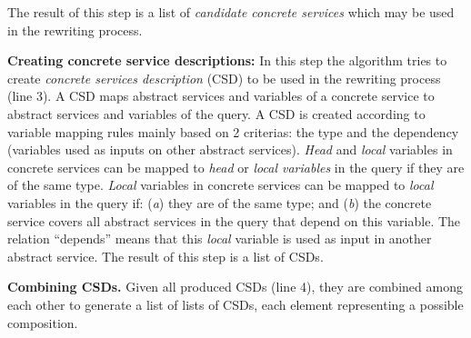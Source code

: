 The result of this step is a list of \textit{candidate concrete services} which
may be used in the rewriting process.


\noindent \textbf{Creating concrete service descriptions:} In this step  the
 algorithm tries to create \textit{concrete services description} (CSD) to be
 used in the rewriting process (line 3). A CSD maps abstract services and
 variables of a concrete service to abstract services and variables of the
 query. A CSD is created 
according to variable mapping rules mainly based on 2 criterias: the type and the dependency (variables used as inputs on other abstract services). 
\textit{Head} and \textit{local} variables in concrete services can be mapped to \textit{head} or \textit{local variables} in the query if they are of the same type. 
\textit{Local} variables in concrete services can be mapped to \textit{local} variables in the query if: (\textit{a}) they are of the same type; and (\textit{b}) the concrete service covers all abstract services in
the query that depend on this variable. The relation ``depends''  means that this \textit{local} variable is used as input in another abstract service. The  result of this step is a list of CSDs.
  

 
\noindent \textbf{Combining CSDs.} Given all produced CSDs  (line
4), they are combined among each other to generate  a list of lists of CSDs, each element representing a possible composition.

